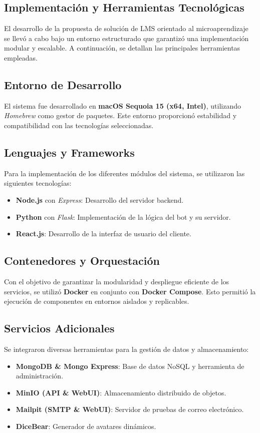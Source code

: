 \subsection{Implementación y Herramientas Tecnológicas}

El desarrollo de la propuesta de solución de LMS orientado al microaprendizaje
se llevó a cabo bajo un entorno estructurado que garantizó una implementación
modular y escalable. A continuación, se detallan las principales herramientas
empleadas.

\subsection{Entorno de Desarrollo}
El sistema fue desarrollado en \textbf{macOS Sequoia 15 (x64, Intel)},
utilizando \textit{Homebrew} como gestor de paquetes. Este entorno proporcionó
estabilidad y compatibilidad con las tecnologías seleccionadas.

\subsection{Lenguajes y Frameworks}
Para la implementación de los diferentes módulos del sistema, se utilizaron las
siguientes tecnologías:
\begin{itemize}
	\item \textbf{Node.js} con \textit{Express}: Desarrollo del servidor
	backend.
	\item \textbf{Python} con \textit{Flask}: Implementación de la lógica del
	bot y su servidor.
	\item \textbf{React.js}: Desarrollo de la interfaz de usuario del cliente.
\end{itemize}

\subsection{Contenedores y Orquestación}
Con el objetivo de garantizar la modularidad y despliegue eficiente de los
servicios, se utilizó \textbf{Docker} en conjunto con \textbf{Docker Compose}.
Esto permitió la ejecución de componentes en entornos aislados y replicables.

\subsection{Servicios Adicionales}
Se integraron diversas herramientas para la gestión de datos y almacenamiento:
\begin{itemize}
	\item \textbf{MongoDB \& Mongo Express}: Base de datos NoSQL y herramienta
	de administración.
	\item \textbf{MinIO (API \& WebUI)}: Almacenamiento distribuido de objetos.
	\item \textbf{Mailpit (SMTP \& WebUI)}: Servidor de pruebas de correo
	electrónico.
	\item \textbf{DiceBear}: Generador de avatares dinámicos.
\end{itemize}

